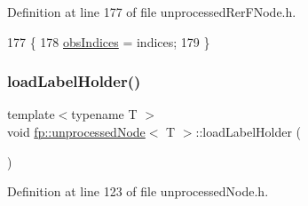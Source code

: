 Definition at line 177 of file unprocessed\+Rer\+F\+Node.\+h.


\begin{DoxyCode}
177                                                                               \{
178                     \hyperlink{classfp_1_1unprocessedNode_aba9f03124658f62906fa8ded53cef535}{obsIndices} = indices;
179                 \}
\end{DoxyCode}
\mbox{\label{classfp_1_1unprocessedNode_a7b286c437f8f73fb3431358c11898a82}} 
\subsubsection{\texorpdfstring{load\+Label\+Holder()}{loadLabelHolder()}\hspace{0.1cm}{\footnotesize\ttfamily [1/2]}}
{\footnotesize\ttfamily template$<$typename T $>$ \\
void \hyperlink{classfp_1_1unprocessedNode}{fp\+::unprocessed\+Node}$<$ T $>$\+::load\+Label\+Holder (\begin{DoxyParamCaption}{ }\end{DoxyParamCaption})\hspace{0.3cm}{\ttfamily [inline]}}



Definition at line 123 of file unprocessed\+Node.\+h.


